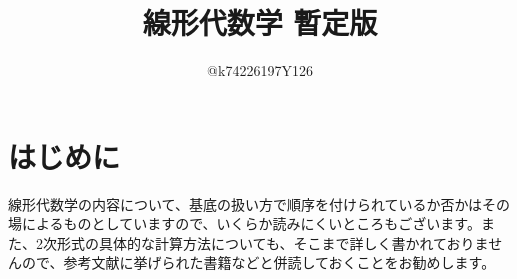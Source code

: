 \documentclass[10pt,a4paper,titlepage]{jsarticle}
\title{線形代数学 暫定版}
\author{@k74226197Y126}
\begin{document}
\maketitle
{}
\section*{はじめに}
\par
線形代数学の内容について、基底の扱い方で順序を付けられているか否かはその場によるものとしていますので、いくらか読みにくいところもございます。また、2次形式の具体的な計算方法についても、そこまで詳しく書かれておりませんので、参考文献に挙げられた書籍などと併読しておくことをお勧めします。
\tableofcontents
\clearpage
{}


\clearpage

\clearpage

\clearpage

\clearpage

\clearpage

\clearpage

\clearpage

\clearpage

\clearpage

\clearpage

\clearpage


\clearpage

\clearpage

\clearpage

\clearpage

\clearpage

\clearpage

\clearpage

\clearpage


\clearpage

\clearpage

\clearpage

\clearpage

\clearpage

\clearpage

\clearpage

\clearpage

\clearpage

\clearpage

\clearpage


\clearpage

\clearpage

\clearpage

\clearpage

\clearpage

\clearpage

\clearpage

\clearpage

\clearpage

\end{document}
